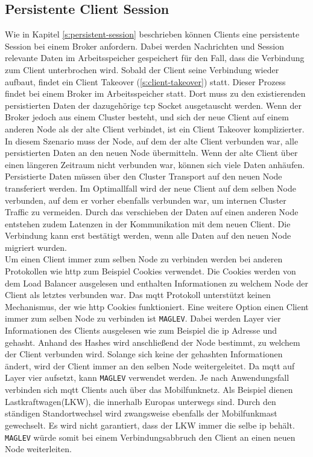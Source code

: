 \subsection{Persistente Client Session}
Wie in Kapitel \ref{s:persistent-session} beschrieben können Clients eine persistente Session bei einem Broker anfordern. Dabei werden Nachrichten und Session relevante Daten im Arbeitsspeicher gespeichert für den Fall, dass die Verbindung zum Client unterbrochen wird. Sobald der Client seine Verbindung wieder aufbaut, findet ein Client Takeover (\ref{s:client-takeover}) statt.
Dieser Prozess findet bei einem Broker im Arbeitsspeicher statt.
Dort muss zu den existierenden persistierten Daten der dazugehörige \ac{tcp} Socket ausgetauscht werden.
Wenn der Broker jedoch aus einem Cluster besteht, und sich der neue Client auf einem anderen Node als der alte Client verbindet, ist ein Client Takeover komplizierter.
In diesem Szenario muss der Node, auf dem der alte Client verbunden war, alle persistierten Daten an den neuen Node übermitteln.
Wenn der alte Client über einen längeren Zeitraum nicht verbunden war, können sich viele Daten anhäufen.
Persistierte Daten müssen über den Cluster Transport auf den neuen Node transferiert werden. Im Optimallfall wird der neue Client auf dem selben Node verbunden, auf dem er vorher ebenfalls verbunden war, um internen Cluster Traffic zu vermeiden. Durch das verschieben der Daten auf einen anderen Node entstehen zudem Latenzen in der Kommunikation mit dem neuen Client. Die Verbindung kann erst bestätigt werden, wenn alle Daten auf den neuen Node migriert wurden.
\\
Um einen Client immer zum selben Node zu verbinden werden bei anderen Protokollen wie \ac{http} zum Beispiel Cookies verwendet. Die Cookies werden von dem Load Balancer ausgelesen und enthalten Informationen zu welchem Node der Client als letztes verbunden war. Das \ac{mqtt} Protokoll unterstützt keinen Mechanismus, der wie \ac{http} Cookies funktioniert.
Eine weitere Option einen Client immer zum selben Node zu verbinden ist \verb|MAGLEV|. Dabei werden Layer vier Informationen des Clients ausgelesen wie zum Beispiel die \ac{ip} Adresse und gehasht. Anhand des Hashes wird anschlie{\ss}end der Node bestimmt, zu welchem der Client verbunden wird. Solange sich keine der gehashten Informationen ändert, wird der Client immer an den selben Node weitergeleitet. Da \ac{mqtt} auf Layer vier aufsetzt, kann \verb|MAGLEV| verwendet werden.
Je nach Anwendungsfall verbinden sich \ac{mqtt} Clients auch über das Mobilfunknetz. Als Beispiel dienen Lastkraftwagen(LKW), die innerhalb Europas unterwegs sind. Durch den ständigen Standortwechsel wird zwangsweise ebenfalls der Mobilfunkmast gewechselt. Es wird nicht garantiert, dass der LKW immer die selbe \ac{ip} behält. \verb|MAGLEV| würde somit bei einem Verbindungsabbruch den Client an einen neuen Node weiterleiten.


